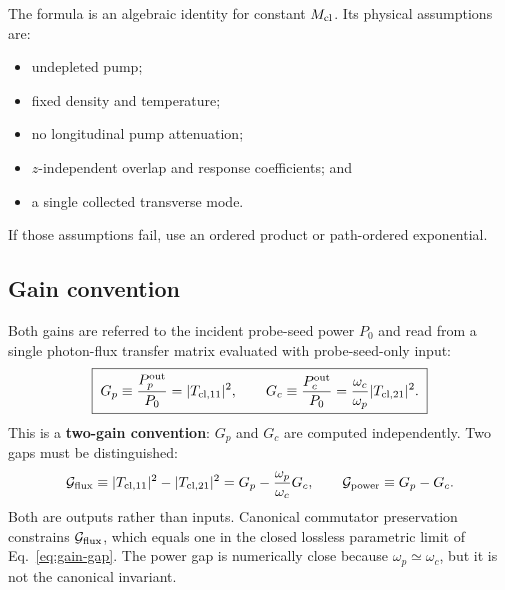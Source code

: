 \documentclass[11pt,a4paper]{article}
\begin{document}
The formula is an algebraic identity for constant $M_{\rm cl}$. Its physical
assumptions are:
\begin{itemize}
\item undepleted pump;
\item fixed density and temperature;
\item no longitudinal pump attenuation;
\item $z$-independent overlap and response coefficients; and
\item a single collected transverse mode.
\end{itemize}
If those assumptions fail, use an ordered product or path-ordered exponential.

\subsection{Gain convention}
\label{sec:gain-convention}

Both gains are referred to the incident probe-seed power $P_0$ and read
from a single photon-flux transfer matrix evaluated with probe-seed-only input:
\begin{equation}
\boxed{\;
G_p\equiv\frac{P_p^{\rm out}}{P_0}=|T_{{\rm cl},11}|^2,\qquad
G_c\equiv\frac{P_c^{\rm out}}{P_0}
=\frac{\omega_c}{\omega_p}|T_{{\rm cl},21}|^2 .\;}
\label{eq:mean-field-gains}
\end{equation}
This is a \textbf{two-gain convention}: $G_p$ and $G_c$ are computed
independently. Two gaps must be distinguished:
\begin{equation}
\mathcal G_{\rm flux}\equiv
|T_{{\rm cl},11}|^2-|T_{{\rm cl},21}|^2
=G_p-\frac{\omega_p}{\omega_c}G_c,
\qquad
\mathcal G_{\rm power}\equiv G_p-G_c .
\label{eq:gain-gap-observable}
\end{equation}
Both are outputs rather than inputs. Canonical commutator preservation constrains
$\mathcal G_{\rm flux}$, which equals one in the closed lossless parametric
limit of Eq.~\eqref{eq:gain-gap}. The power gap is numerically close because
$\omega_p\simeq\omega_c$, but it is not the canonical invariant.
\end{document}
